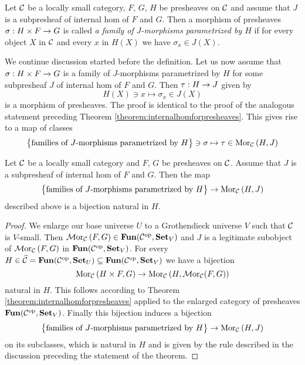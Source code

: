 \begin{definition}
Let ${\mathcal C}$ be a locally small category, $F$, $G$, $H$ be presheaves on ${\mathcal C}$ and assume that $J$ is a subpresheaf of internal hom of $F$ and $G$. Then a morphism of presheaves $\sigma:H\times F\rightarrow G$ is called \textit{a family of $J$-morphisms parametrized by $H$} if for every object $X$ in ${\mathcal C}$ and every $x$ in $H(X)$ we have $\sigma_x\in J(X)$.
\end{definition}
\noindent
We continue discussion started before the definition. Let us now assume that $\sigma:H\times F\rightarrow G$ is a family of $J$-morphisms parametrized by $H$ for some subpresheaf $J$ of internal hom of $F$ and $G$. Then $\tau:H\rightarrow J$ given by
$$H(X)\ni x\mapsto \sigma_x\in J(X)$$
is a morphism of presheaves. The proof is identical to the proof of the analogous statement preceding Theorem \ref{theorem:internalhomforpresheaves}. This gives rise to a map of classes
$$\big\{\mbox{families of $J$-morphisms parametrized by }H\big\}\ni \sigma \mapsto \tau \in \mathrm{Mor}_{{\mathcal C}}\left(H,J\right)$$

\begin{theorem}\label{theorem:subpresheavesofinternalhom}
Let ${\mathcal C}$ be a locally small category and $F$, $G$ be presheaves on ${\mathcal C}$. Assume that $J$ is a subpresheaf of internal hom of $F$ and $G$. Then the map 
$$\big\{\mbox{families of $J$-morphisms parametrized by }H\big\}\rightarrow \mathrm{Mor}_{{\mathcal C}}\left(H,J\right)$$
described above is a bijection natural in $H$.
\end{theorem}
\begin{proof}
We enlarge our base universe $U$ to a Grothendieck universe $V$ such that ${\mathcal C}$ is $V$-small. Then $\mathcal{M}\mathrm{or}_{{\mathcal C}}\left(F,G\right)\in \mathbf{Fun}({\mathcal C}^{\mathrm{op}},\mathbf{Set}_V)$ and $J$ is a legitimate subobject of $\mathcal{M}\mathrm{or}_{{\mathcal C}}\left(F,G\right)$ in $\mathbf{Fun}({\mathcal C}^{\mathrm{op}},\mathbf{Set}_V)$. For every $H\in \widehat{{\mathcal C}} = \mathbf{Fun}({\mathcal C}^{\mathrm{op}},\mathbf{Set}_U)\subseteq \mathbf{Fun}({\mathcal C}^{\mathrm{op}},\mathbf{Set}_V)$ we have a bijection
$$\mathrm{Mor}_{{\mathcal C}}\left(H\times F, G\right)\rightarrow \mathrm{Mor}_{{\mathcal C}}\left(H,\mathcal{M}\mathrm{or}_{{\mathcal C}}(F,G)\right)$$
natural in $H$. This follows according to Theorem \ref{theorem:internalhomforpresheaves} applied to the enlarged category of presheaves $\mathbf{Fun}({\mathcal C}^{\mathrm{op}},\mathbf{Set}_V)$. Finally this bijection induces a bijection
$$\big\{\mbox{families of $J$-morphisms parametrized by }H\big\}\rightarrow \mathrm{Mor}_{{\mathcal C}}\left(H,J\right)$$
on its subclasses, which is natural in $H$ and is given by the rule described in the discussion preceding the statement of the theorem.
\end{proof}


